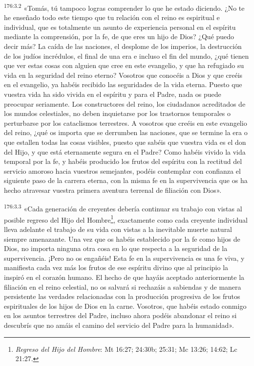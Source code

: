 \par
\textsuperscript{176:3.2} «Tomás, tú tampoco logras comprender lo que he estado diciendo. ¿No te he enseñado todo este tiempo que tu relación con el reino es espiritual e individual, que es totalmente un asunto de experiencia personal en el espíritu mediante la comprensión, por la fe, de que eres un hijo de Dios? ¿Qué puedo decir más? La caída de las naciones, el desplome de los imperios, la destrucción de los judíos incrédulos, el final de una era e incluso el fin del mundo, ¿qué tienen que ver estas cosas con alguien que cree en este evangelio, y que ha refugiado su vida en la seguridad del reino eterno? Vosotros que conocéis a Dios y que creéis en el evangelio, ya habéis recibido las seguridades de la vida eterna. Puesto que vuestra vida ha sido vivida en el espíritu y para el Padre, nada os puede preocupar seriamente. Los constructores del reino, los ciudadanos acreditados de los mundos celestiales, no deben inquietarse por los trastornos temporales o perturbarse por los cataclismos terrestres. A vosotros que creéis en este evangelio del reino, ¿qué os importa que se derrumben las naciones, que se termine la era o que estallen todas las cosas visibles, puesto que sabéis que vuestra vida es el don del Hijo, y que está eternamente segura en el Padre? Como habéis vivido la vida temporal por la fe, y habéis producido los frutos del espíritu con la rectitud del servicio amoroso hacia vuestros semejantes, podéis contemplar con confianza el siguiente paso de la carrera eterna, con la misma fe en la supervivencia que os ha hecho atravesar vuestra primera aventura terrenal de filiación con Dios».

\par
\textsuperscript{176:3.3} «Cada generación de creyentes debería continuar su trabajo con vistas al posible regreso del Hijo del Hombre\footnote{\textit{Regreso del Hijo del Hombre}: Mt 16:27; 24:30b; 25:31; Mc 13:26; 14:62; Lc 21:27.}, exactamente como cada creyente individual lleva adelante el trabajo de su vida con vistas a la inevitable muerte natural siempre amenazante. Una vez que os habéis establecido por la fe como hijos de Dios, no importa ninguna otra cosa en lo que respecta a la seguridad de la supervivencia. ¡Pero no os engañéis! Esta fe en la supervivencia es una fe viva, y manifiesta cada vez más los frutos de ese espíritu divino que al principio la inspiró en el corazón humano. El hecho de que hayáis aceptado anteriormente la filiación en el reino celestial, no os salvará si rechazáis a sabiendas y de manera persistente las verdades relacionadas con la producción progresiva de los frutos espirituales de los hijos de Dios en la carne. Vosotros, que habéis estado conmigo en los asuntos terrestres del Padre, incluso ahora podéis abandonar el reino si descubrís que no amáis el camino del servicio del Padre para la humanidad».

